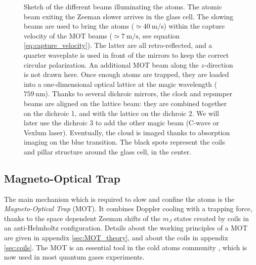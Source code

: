 \documentclass[11pt]{article}
\numberwithin{equation}{section}
\numberwithin{figure}{section}
\begin{document}
%
\begin{figure}[ht]
	\centering
	\def\svgwidth{0.7\linewidth}
    
	\caption{\small Sketch of the different beams illuminating the atoms. The atomic beam exiting the Zeeman slower arrives in the glass cell. The slowing beams are used to bring the atoms ($\simeq \SI{40}{\metre\per\second}$) within the capture velocity of the MOT beams ($\simeq \SI{7}{\metre\per\second}$, see equation \eqref{eq:capture_velocity}). The latter are all retro-reflected, and a quarter waveplate is used in front of the mirrors to keep the correct circular polarization. An additional MOT beam along the $z$-direction is not drawn here. Once enough atoms are trapped, they are loaded into a one-dimensional optical lattice at the magic wavelength ($\SI{759}{\nano\metre}$). Thanks to several dichroic mirrors, the clock and repumper beams are aligned on the lattice beam: they are combined together on the dichroic 1, and with the lattice on the dichroic 2. We will later use the dichroic 3 to add the other magic beam (C-wave or Vexlum laser). Eventually, the cloud is imaged thanks to absorption imaging on the blue transition. The black spots represent the coils and pillar structure around the glass cell, in the center.}
    \label{fig:setup}
\end{figure}
%

\subsection{Magneto-Optical Trap}
\label{sec:MOT}

The main mechanism which is required to slow and confine the atoms is the \emph{Magneto-Optical Trap} (MOT). It combines Doppler cooling with a trapping force, thanks to the space dependent Zeeman shifts of the $m_J$ states created by coils in an anti-Helmholtz configuration. Details about the working principles of a MOT are given in appendix \ref{sec:MOT_theory}, and about the coils in appendix \ref{sec:coils}. The MOT is an essential tool in the cold atoms community  \citep[with a first demonstration by][]{1987_raab}, which is now used in most quantum gases experiments.
\end{document}
